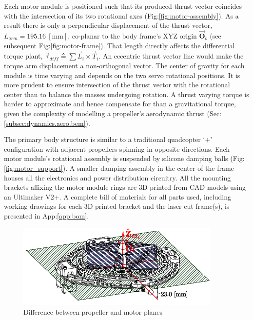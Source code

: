 Each motor module is positioned such that its produced thrust vector coincides with the intersection of its two rotational axes (Fig:\ref{fig:motor-assembly}). As a result there is only a perpendicular displacement of the thrust vector, $L_{arm}=195.16~[\text{mm}]$, co-planar to the body frame's XYZ origin $\vec{\mathbf{O}}_b$ (see subsequent Fig:\ref{fig:motor-frame}). That length directly affects the differential torque plant, $\vec{\tau}_{diff}\triangleq\sum\vec{L}_i\times\vec{T}_i$. An eccentric thrust vector line would make the torque arm displacement a non-orthogonal vector. The center of gravity for each module is time varying and depends on the two servo rotational positions. It is more prudent to ensure intersection of the thrust vector with the rotational center than to balance the masses undergoing rotation. A thrust varying torque is harder to approximate and hence compensate for than a gravitational torque, given the complexity of modelling a propeller's aerodynamic thrust (Sec:\ref{subsec:dynamics.aero.bem}).
\par
The primary body structure is similar to a traditional quadcopter `+' configuration with adjacent propellers spinning in opposite directions. Each motor module's rotational assembly is suspended by silicone damping balls (Fig:\ref{fig:motor_support}). A smaller damping assembly in the center of the frame houses all the electronics and power distribution circuitry. All the mounting brackets affixing the motor module rings are 3D printed from CAD models using an Ultimaker V2+\cite{ultimaker}. A complete bill of materials for all parts used, including working drawings for each 3D printed bracket and the laser cut frame(s), is presented in App:\ref{app:bom}.
\par
\begin{figure}[hbtp]
\centering
\includegraphics[width=0.9\textwidth]{figs/motor-prop}
\vspace{-10pt}
\caption{Difference between propeller and motor planes}
\label{fig:motor_prop}
\vspace{-15pt}
\end{figure}
